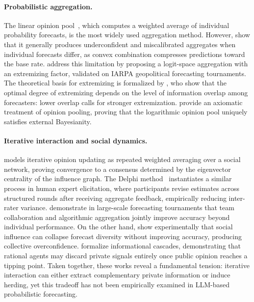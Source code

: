 \documentclass[11pt]{article}
\theoremstyle{definition}          %
\begin{document}
\paragraph{Probabilistic aggregation.}
The linear opinion pool~\citep{9ca5e582-1e4c-323f-9ab1-c62032d22e48}, which computes a weighted average of individual probability forecasts, is the most widely used aggregation method.
However, \citet{10.1111/j.1467-9868.2009.00726.x} show that it generally produces underconfident and miscalibrated aggregates when individual forecasts differ, as convex combination compresses predictions toward the base rate.
\citet{SATOPAA2014344} address this limitation by proposing a logit-space aggregation with an extremizing factor, validated on IARPA geopolitical forecasting tournaments.
The theoretical basis for extremizing is formalized by \citet{abernethy2014information}, who show that the optimal degree of extremizing depends on the level of information overlap among forecasters: lower overlap calls for stronger extremization.
\citet{10.1214/ss/1177013825} provide an axiomatic treatment of opinion pooling, proving that the logarithmic opinion pool uniquely satisfies external Bayesianity.


\paragraph{Iterative interaction and social dynamics.}
\citet{612bb50a-4bdd-3a32-b6eb-7837600cc9c4} models iterative opinion updating as repeated weighted averaging over a social network, proving convergence to a consensus determined by the eigenvector centrality of the influence graph. The Delphi method~\citep{DALKEY1969408} instantiates a similar process in human expert elicitation, where participants revise estimates across structured rounds after receiving aggregate feedback, empirically reducing inter-rater variance. \citet{LONKANI2026106120} demonstrate in large-scale forecasting tournaments that team collaboration and algorithmic aggregation jointly improve accuracy beyond individual performance. On the other hand, \citet{Lorenz2011HowSI} show experimentally that social influence can collapse forecast diversity without improving accuracy, producing collective overconfidence. \citet{bikhchandani1992theory} formalize informational cascades, demonstrating that rational agents may discard private signals entirely once public opinion reaches a tipping point. Taken together, these works reveal a fundamental tension: iterative interaction can either extract complementary private information or induce herding, yet this tradeoff has not been empirically examined in LLM-based probabilistic forecasting.
\end{document}
